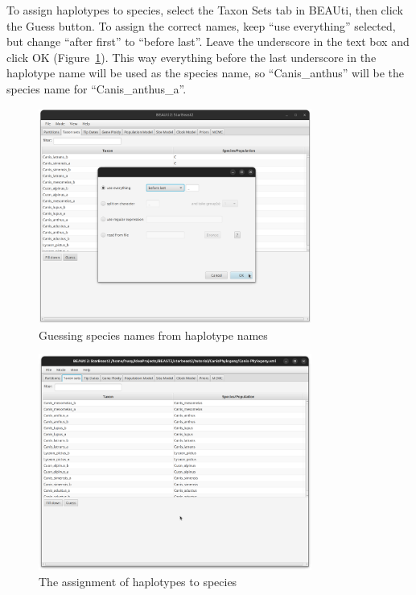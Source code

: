 \documentclass[12pt]{article}
\begin{document}
To assign haplotypes to species, select the Taxon Sets tab in BEAUti, then
click the Guess button. To assign the correct names, keep ``use everything''
selected, but change ``after first'' to ``before last''. Leave the underscore
in the text box and click OK (Figure~\ref{fig:guessTaxonMap}). This way everything before
the last underscore in the haplotype name will be used as the species name,
so ``Canis\_anthus'' will be the species name for ``Canis\_anthus\_a''.

\begin{figure}[htb!]
\centering
\includegraphics[width=0.8\textwidth]{figures/guessTaxonMap.png}
\caption
{Guessing species names from haplotype names}
\label{fig:guessTaxonMap}
\end{figure}

\begin{figure}[htb!]
\centering
\includegraphics[width=0.8\textwidth]{figures/taxonMap.png}
\caption
{The assignment of haplotypes to species}
\label{fig:taxonMap}
\end{figure}
\end{document}
